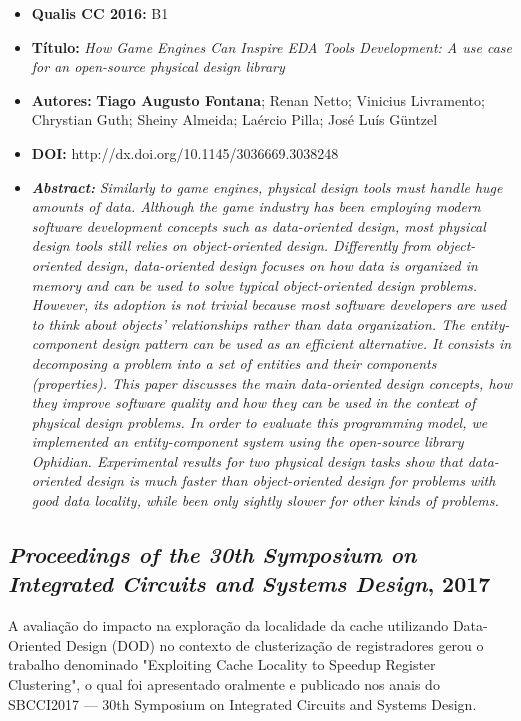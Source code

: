 \begin{itemize}
\item \textbf{Qualis CC 2016:} B1
\item \textbf{Título:} \textit{How Game Engines Can Inspire EDA Tools Development: A use case for an open-source physical design library}
\item \textbf{Autores:}  \textbf{Tiago Augusto Fontana}; Renan Netto; Vinicius Livramento; Chrystian Guth; Sheiny Almeida; Laércio Pilla; José Luís Güntzel
\item \textbf{DOI:} http://dx.doi.org/10.1145/3036669.3038248
\item \textbf{\textit{Abstract:}} \emph{Similarly to game engines, physical design tools must handle huge amounts of data. Although the game industry has been employing modern software development concepts such as data-oriented design, most physical design tools still relies on object-oriented design. Differently from object-oriented design, data-oriented design focuses on how data is organized in memory and can be used to solve typical object-oriented design problems. However, its adoption is not trivial because most software developers are used to think about objects' relationships rather than data organization. The entity-component design pattern can be used as an efficient alternative. It consists in decomposing a problem into a set of entities and their components (properties). This paper discusses the main data-oriented design concepts, how they improve software quality and how they can be used in the context of physical design problems. In order to evaluate this programming model, we implemented an entity-component system using the open-source library Ophidian. Experimental results for two physical design tasks show that data-oriented design is much faster than object-oriented design for problems with good data locality, while been only sightly slower for other kinds of problems.}
\end{itemize}


\subsection{\textit{Proceedings of the 30th Symposium on Integrated Circuits and Systems Design}, 2017}

A avaliação do impacto na exploração da localidade da cache utilizando Data-Oriented Design (DOD) no contexto de clusterização de registradores gerou o trabalho denominado "Exploiting Cache Locality to Speedup Register Clustering", o qual foi apresentado oralmente e publicado nos anais do SBCCI2017 --- 30th Symposium on Integrated Circuits and Systems Design.

